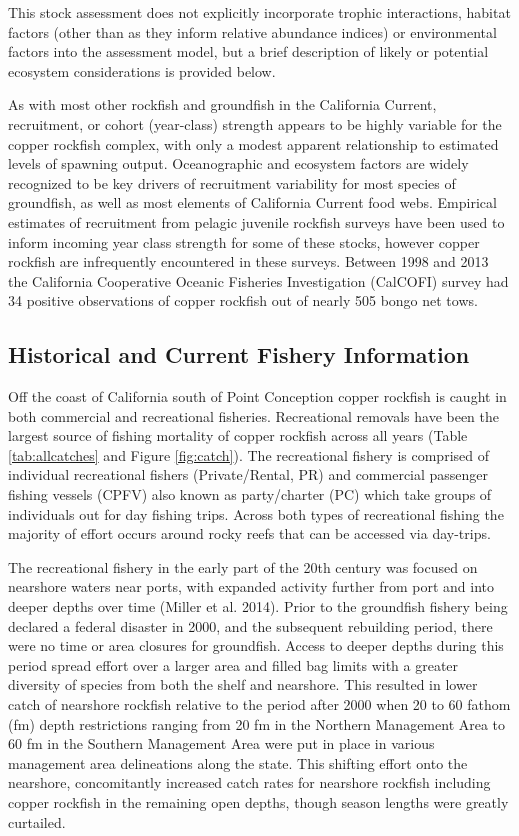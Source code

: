 \documentclass[11pt,
  english,
  letterpaper,
]{article}
\begin{document}
This stock assessment does not explicitly incorporate trophic interactions, habitat factors (other than as they inform relative abundance indices) or environmental factors into the assessment model, but a brief description of likely or potential ecosystem considerations is provided below.

As with most other rockfish and groundfish in the California Current, recruitment, or cohort (year-class) strength appears to be highly variable for the copper rockfish complex, with only a modest apparent relationship to estimated levels of spawning output. Oceanographic and ecosystem factors are widely recognized to be key drivers of recruitment variability for most species of groundfish, as well as most elements of California Current food webs. Empirical estimates of recruitment from pelagic juvenile rockfish surveys have been used to inform incoming year class strength for some of these stocks, however copper rockfish are infrequently encountered in these surveys. Between 1998 and 2013 the California Cooperative Oceanic Fisheries Investigation (CalCOFI) survey had 34 positive observations of copper rockfish out of nearly 505 bongo net tows.

\hypertarget{historical-and-current-fishery-information}{%
\subsection{Historical and Current Fishery Information}\label{historical-and-current-fishery-information}}

Off the coast of California south of Point Conception copper rockfish is caught in both commercial and recreational fisheries. Recreational removals have been the largest source of fishing mortality of copper rockfish across all years (Table \ref{tab:allcatches} and Figure \ref{fig:catch}). The recreational fishery is comprised of individual recreational fishers (Private/Rental, PR) and commercial passenger fishing vessels (CPFV) also known as party/charter (PC) which take groups of individuals out for day fishing trips. Across both types of recreational fishing the majority of effort occurs around rocky reefs that can be accessed via day-trips.

The recreational fishery in the early part of the 20th century was focused on nearshore waters near ports, with expanded activity further from port and into deeper depths over time (Miller et al. 2014). Prior to the groundfish fishery being declared a federal disaster in 2000, and the subsequent rebuilding period, there were no time or area closures for groundfish. Access to deeper depths during this period spread effort over a larger area and filled bag limits with a greater diversity of species from both the shelf and nearshore. This resulted in lower catch of nearshore rockfish relative to the period after 2000 when 20 to 60 fathom (fm) depth restrictions ranging from 20 fm in the Northern Management Area to 60 fm in the Southern Management Area were put in place in various management area delineations along the state. This shifting effort onto the nearshore, concomitantly increased catch rates for nearshore rockfish including copper rockfish in the remaining open depths, though season lengths were greatly curtailed.
\end{document}
